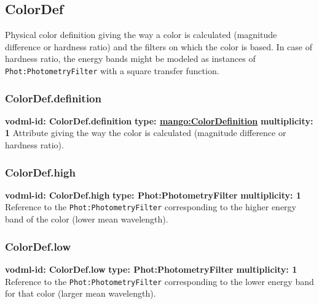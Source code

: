   \subsection{ColorDef}
    \label{sect:ColorDef}
    Physical color definition giving the way a color is calculated (magnitude difference or hardness ratio) and the filters on which the color is based. In case of hardness ratio, the energy bands might be modeled as instances of \texttt{Phot:PhotometryFilter} with a square transfer function.

    \subsubsection{ColorDef.definition}
    \textbf{vodml-id: ColorDef.definition} \newline
    \textbf{type: \hyperref[sect:ColorDefinition]{mango:ColorDefinition}} \newline
    \textbf{multiplicity: 1} \newline
    Attribute giving the way the color is calculated (magnitude difference or hardness ratio).

    \subsubsection{ColorDef.high}
    \textbf{vodml-id: ColorDef.high} \newline
    \textbf{type: Phot:PhotometryFilter} \newline
    \textbf{multiplicity: 1} \newline
    Reference to the \texttt{Phot:PhotometryFilter} \citep{2022ivoa.spec.1101S} corresponding to the higher energy band of the color (lower mean wavelength).

    \subsubsection{ColorDef.low}
    \textbf{vodml-id: ColorDef.low} \newline
    \textbf{type: Phot:PhotometryFilter} \newline
    \textbf{multiplicity: 1} \newline
    Reference to the \texttt{Phot:PhotometryFilter} corresponding to the lower energy band for that color (larger mean wavelength).

